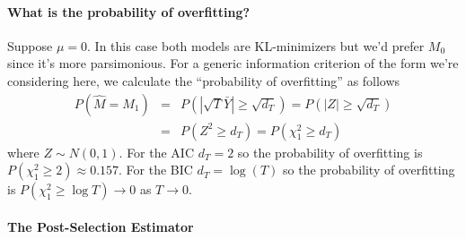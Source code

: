 \paragraph{What is the probability of overfitting?} Suppose $\mu = 0$. In this case both models are KL-minimizers but we'd prefer $M_0$ since it's more parsimonious. For a generic information criterion of the form we're considering here, we calculate the ``probability of overfitting'' as follows
\begin{eqnarray*}
	P\left(\widehat{M} = M_1\right) &=& P\left(|\sqrt{T}\bar{Y}|\geq \sqrt{d_T}\right) = P(|Z|\geq \sqrt{d_T})\\
	 &=& P(Z^2 \geq d_T) = P(\chi^2_1 \geq d_T)
\end{eqnarray*}
where $Z \sim N(0,1)$. For the AIC $d_T = 2$ so the probability of overfitting is $P(\chi^2_1 \geq 2)\approx 0.157$. For the BIC $d_T = \log(T)$ so the probability of overfitting is $P(\chi^2_1 \geq \log T) \rightarrow 0$ as $T\rightarrow 0$.

\paragraph{The Post-Selection Estimator}

